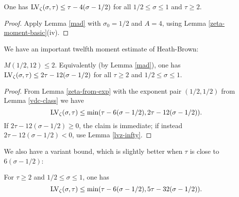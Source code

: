 \begin{corollary}\label{lvz-4} One has $\mathrm{LV}_\zeta(\sigma,\tau) \leq \tau - 4 (\sigma-1/2)$ for all $1/2 \leq \sigma \leq 1$ and $\tau \geq 2$.
\end{corollary}

\begin{proof} Apply Lemma \ref{mad} with $\sigma_0 = 1/2$ and $A=4$, using Lemma \ref{zeta-moment-basic}(iv).
\end{proof}

We have an important twelfth moment estimate of Heath-Brown:

\begin{theorem}\label{hb-12}\cite{heathbrown_twelfth_1978} $M(1/2,12) \leq 2$.  Equivalently (by Lemma \ref{mad}), one has $\mathrm{LV}_\zeta(\sigma,\tau) \leq 2\tau - 12 (\sigma-1/2)$ for all $\tau \geq 2$ and $1/2 \leq \sigma \leq 1$.
\end{theorem}

\begin{proof}  From Lemma \ref{zeta-from-exp} with the exponent pair $(1/2,1/2)$ from Lemma \ref{vdc-class} we have
$$ \mathrm{LV}_\zeta(\sigma,\tau) \leq \min( \tau - 6(\sigma-1/2), 2\tau - 12 (\sigma-1/2) ).$$
If $2\tau - 12 (\sigma-1/2)  \geq 0$, the claim is immediate; if instead $2\tau - 12 (\sigma-1/2) < 0$, use Lemma \ref{lvz-infty}.
\end{proof}

We also have a variant bound, which is slightly better when $\tau$ is close to $6(\sigma-1/2)$:

\begin{theorem}\label{hb-12-aux}  For $\tau \geq 2$ and $1/2 \leq \sigma \leq 1$, one has
$$ \mathrm{LV}_\zeta(\sigma,\tau) \leq \min( \tau-6(\sigma-1/2), 5\tau-32(\sigma-1/2)).$$
\end{theorem}

